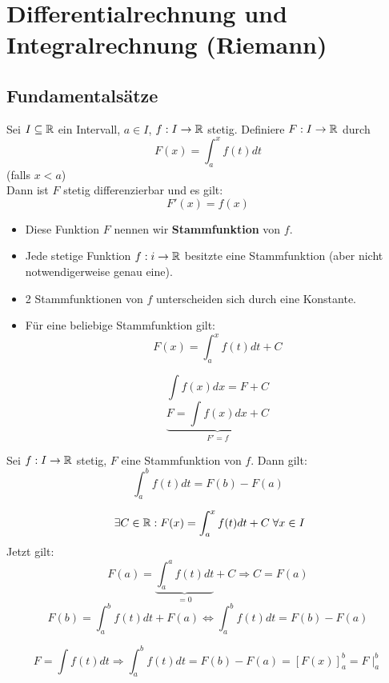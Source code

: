 \documentclass[main.tex]{subfiles}
\begin{document}
\chapter{Differentialrechnung und Integralrechnung (Riemann)}


\section{Fundamentalsätze}

\begin{Theorem}
  Sei $I \subseteq \mathbb{R}$ ein Intervall, $a \in I$, $f: I \to \mathbb{R}$ stetig. Definiere $F: I \to \mathbb{R}$ durch
  $$F(x) = \int_a^xf(t)dt$$
  (falls $x < a$)\\
  Dann ist $F$ stetig differenzierbar und es gilt:
  $$F'(x) = f(x)$$
  \begin{itemize}
    \item Diese Funktion $F$ nennen wir \textbf{Stammfunktion} von $f$.
    \item Jede stetige Funktion $f: i \to \mathbb{R}$ besitzte eine Stammfunktion (aber nicht notwendigerweise genau eine).
    \item 2 Stammfunktionen von $f$ unterscheiden sich durch eine Konstante.
    \item Für eine beliebige Stammfunktion gilt:
      $$F(x) = \int_a^x f(t)dt + C$$
      \begin{Bemerkung}
        $$\int f(x) dx = F + C$$
        $$\underbrace{F = \int f(x) dx + C}_{F' = f}$$
      \end{Bemerkung}
  \end{itemize}
\end{Theorem}

\begin{Korollar}
  Sei $f: I \to \mathbb{R}$ stetig, $F$ eine Stammfunktion von $f$. Dann gilt:
  $$\int_a^b f(t)dt = F(b) - F(a)$$
\end{Korollar}

\begin{Beweis}
  $$\;\exists C \in \mathbb{R} : F(x) = \int_a^x f(t)dt + C \;\forall x \in I$$
  Jetzt gilt:
  $$F(a) = \underbrace{\int_a^a f(t)dt}_{=0} + C \Rightarrow C = F(a)$$
  $$F(b) = \int_a^b f(t)dt + F(a) \Leftrightarrow \int_a^b f(t)dt = F(b) - F(a)$$
\end{Beweis}

\begin{Bemerkung}
  $$F = \int f(t) dt \Rightarrow \int_a^b f(t)dt = F(b) - F(a) = [F(x)]_a^b = F\mid_a^b$$
\end{Bemerkung}
\end{document}
